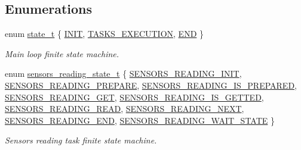 \subsection*{Enumerations}
\begin{DoxyCompactItemize}
\item 
enum \hyperlink{i2c-th_8h_aa0aafed44fec19806d8f9ad834be1248}{state\+\_\+t} \{ \hyperlink{i2c-th_8h_aa0aafed44fec19806d8f9ad834be1248a0cb1b2c6a7db1f1084886c98909a3f36}{I\+N\+IT}, 
\hyperlink{i2c-th_8h_aa0aafed44fec19806d8f9ad834be1248a34f1df650a5075369a6827770c433a91}{T\+A\+S\+K\+S\+\_\+\+E\+X\+E\+C\+U\+T\+I\+ON}, 
\hyperlink{i2c-th_8h_aa0aafed44fec19806d8f9ad834be1248adc6f24fd6915a3f2786a1b7045406924}{E\+ND}
 \}\begin{DoxyCompactList}\small\item\em Main loop finite state machine. \end{DoxyCompactList}
\item 
enum \hyperlink{i2c-th_8h_a48bef3d022ff6f88967496ad53a6b953}{sensors\+\_\+reading\+\_\+state\+\_\+t} \{ \newline
\hyperlink{i2c-th_8h_a48bef3d022ff6f88967496ad53a6b953a2cb28b4d2ce509fc382d6bd1b2d5d16f}{S\+E\+N\+S\+O\+R\+S\+\_\+\+R\+E\+A\+D\+I\+N\+G\+\_\+\+I\+N\+IT}, 
\hyperlink{i2c-th_8h_a48bef3d022ff6f88967496ad53a6b953a7cf0f5ecc300e86aacc2deb266d14724}{S\+E\+N\+S\+O\+R\+S\+\_\+\+R\+E\+A\+D\+I\+N\+G\+\_\+\+P\+R\+E\+P\+A\+RE}, 
\hyperlink{i2c-th_8h_a48bef3d022ff6f88967496ad53a6b953a96e335eefffa76f53459df4a3cf71ac1}{S\+E\+N\+S\+O\+R\+S\+\_\+\+R\+E\+A\+D\+I\+N\+G\+\_\+\+I\+S\+\_\+\+P\+R\+E\+P\+A\+R\+ED}, 
\hyperlink{i2c-th_8h_a48bef3d022ff6f88967496ad53a6b953a8e031386ec7bcc225e75a4a0b408d731}{S\+E\+N\+S\+O\+R\+S\+\_\+\+R\+E\+A\+D\+I\+N\+G\+\_\+\+G\+ET}, 
\newline
\hyperlink{i2c-th_8h_a48bef3d022ff6f88967496ad53a6b953a3dae8abf31ae3db2ab2d679c224fd8be}{S\+E\+N\+S\+O\+R\+S\+\_\+\+R\+E\+A\+D\+I\+N\+G\+\_\+\+I\+S\+\_\+\+G\+E\+T\+T\+ED}, 
\hyperlink{i2c-th_8h_a48bef3d022ff6f88967496ad53a6b953ac2ebb8ebf9d29905d0a30f804376b9fa}{S\+E\+N\+S\+O\+R\+S\+\_\+\+R\+E\+A\+D\+I\+N\+G\+\_\+\+R\+E\+AD}, 
\hyperlink{i2c-th_8h_a48bef3d022ff6f88967496ad53a6b953a739c69b8d018187b0956660ed209e303}{S\+E\+N\+S\+O\+R\+S\+\_\+\+R\+E\+A\+D\+I\+N\+G\+\_\+\+N\+E\+XT}, 
\hyperlink{i2c-th_8h_a48bef3d022ff6f88967496ad53a6b953ab602220e588f3c2ac15b450239d9577a}{S\+E\+N\+S\+O\+R\+S\+\_\+\+R\+E\+A\+D\+I\+N\+G\+\_\+\+E\+ND}, 
\newline
\hyperlink{i2c-th_8h_a48bef3d022ff6f88967496ad53a6b953acfc850b971651f7c8c90cddf593fa399}{S\+E\+N\+S\+O\+R\+S\+\_\+\+R\+E\+A\+D\+I\+N\+G\+\_\+\+W\+A\+I\+T\+\_\+\+S\+T\+A\+TE}
 \}\begin{DoxyCompactList}\small\item\em Sensors reading task finite state machine. \end{DoxyCompactList}
\end{DoxyCompactItemize}
